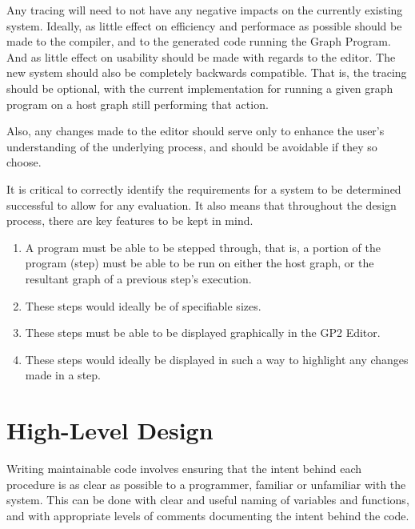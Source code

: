 \documentclass{UoYCSproject}
\begin{document}
Any tracing will need to not have any negative impacts on the currently existing system. Ideally, as little effect on efficiency and performace as possible should be made to the compiler, and to the generated code running the Graph Program. And as little effect on usability should be made with regards to the editor. The new system should also be completely backwards compatible. That is, the tracing should be optional, with the current implementation for running a given graph program on a host graph still performing that action.

Also, any changes made to the editor should serve only to enhance the user's understanding of the underlying process, and should be avoidable if they so choose.

It is critical to correctly identify the requirements for a system to be determined successful to allow for any evaluation. It also means that throughout the design process, there are key features to be kept in mind.
\begin{enumerate}
	\item A program must be able to be stepped through, that is, a portion of the program (step) must be able to be run on either the host graph, or the resultant graph of a previous step's execution.
	\item These steps would ideally be of specifiable sizes.
	\item These steps must be able to be displayed graphically in the GP2 Editor.
	\item These steps would ideally be displayed in such a way to highlight any changes made in a step.
\end{enumerate}

\section{High-Level Design}
Writing maintainable code involves ensuring that the intent behind each procedure is as clear as possible to a programmer, familiar or unfamiliar with the system. This can be done with clear and useful naming of variables and functions, and with appropriate levels of comments documenting the intent behind the code.
\end{document}
